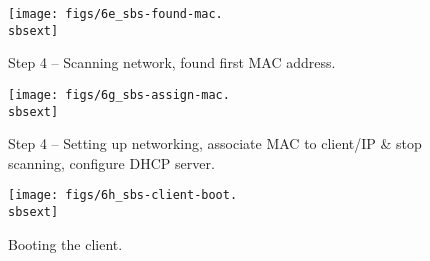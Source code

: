 

\clearpage
\begin{figure}[htbp]
  \begin{center}
    \texttt{[image: figs/6e\_sbs-found-mac.\\sbsext]}
    \caption{Step 4 -- Scanning network, found first MAC address.}
    \label{fig:sbs-setup-network2}
  \end{center}
\end{figure}



\begin{figure}[htbp]
  \begin{center}
    \texttt{[image: figs/6g\_sbs-assign-mac.\\sbsext]}
    \caption{Step 4 -- Setting up networking, associate MAC to
	client/IP \& stop scanning, configure DHCP server.}
    \label{fig:sbs-setup-network4}
  \end{center}
\end{figure}

\setlength{\oddsidemargin}{-0.5in}
\setlength{\evensidemargin}{-0.5in}
\setlength{\textwidth}{7.5in}

\begin{figure}[htbp]
  \begin{center}
    \texttt{[image: figs/6h\_sbs-client-boot.\\sbsext]}
    \caption{Booting the client.}
    \label{fig:sbs-install-boot}
  \end{center}
\end{figure}

